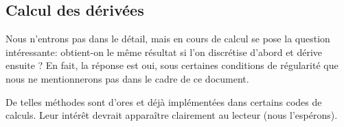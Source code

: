 \medskip
\subsection{Calcul des dérivées}
Nous n'entrons pas dans le détail, mais en cours de calcul se pose la question intéressante: obtient-on le même résultat si l'on discrétise d'abord et dérive ensuite ? En fait, la réponse est oui, sous certaines conditions de régularité que nous ne mentionnerons pas dans le cadre de ce document.

\medskip
{}

De telles méthodes sont d'ores et déjà implémentées dans certains codes de calculs. Leur intérêt devrait apparaître clairement au lecteur (nous l'espérons).